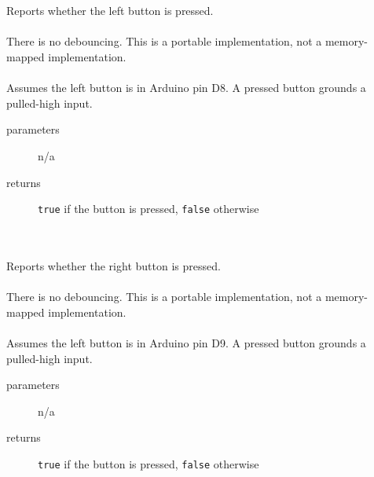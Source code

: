     \begin{itemize}
         \\ \\
        Reports whether the left button is pressed. \\ \\
            There is no debouncing.
            This is a portable implementation, not a memory-mapped implementation. \\ \\
            Assumes the left button is in Arduino pin D8.
            A pressed button grounds a pulled-high input.
            \begin{description}
                \item[parameters] n/a
                \item[returns] \lstinline{true} if the button is pressed, \lstinline{false} otherwise
            \end{description}

         \\ \\
        Reports whether the right button is pressed. \\ \\
        There is no debouncing.
        This is a portable implementation, not a memory-mapped implementation. \\ \\
        Assumes the left button is in Arduino pin D9.
        A pressed button grounds a pulled-high input.
        \begin{description}
            \item[parameters] n/a
            \item[returns] \lstinline{true} if the button is pressed, \lstinline{false} otherwise
        \end{description}


\end{itemize}
